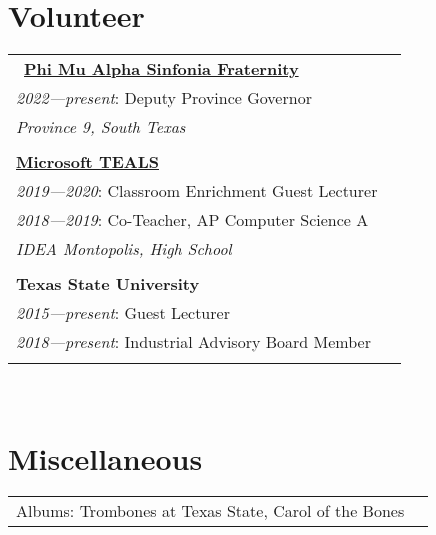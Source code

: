 \documentclass[10pt]{article} %
\newcommand\tab[1][1cm]{\hspace*{#1}}
\begin{document}
\begin{minipage}[t]{0.44\textwidth}
\begin{tabular}{rl}
\end{tabular}\\


\section{Volunteer} 

\begin{tabular}{ll}\
\href{https://province9.org}{\textbf{Phi Mu Alpha Sinfonia Fraternity}}\\
\tab\textit{2022—present}: Deputy Province Governor\\
\tab\tab\textit {Province 9, South Texas}\\
\\

\href{https://www.microsoft.com/en-us/teals}{\textbf{Microsoft TEALS}}\\
\tab\textit{2019—2020}: Classroom Enrichment Guest Lecturer\\
\tab\textit{2018—2019}: Co-Teacher, AP Computer Science A\\
\tab\tab\textit {IDEA Montopolis, High School}\\
\\

\textbf{Texas State University}\\
\tab\textit{2015—present}: Guest Lecturer\\
\tab\textit{2018—present}: Industrial Advisory Board Member\\
\\

\end{tabular}\\


\section{Miscellaneous} 

\begin{tabular}{ll}
Albums: Trombones at Texas State, Carol of the Bones \\
\end{tabular}\\

\end{minipage}
\end{document}
